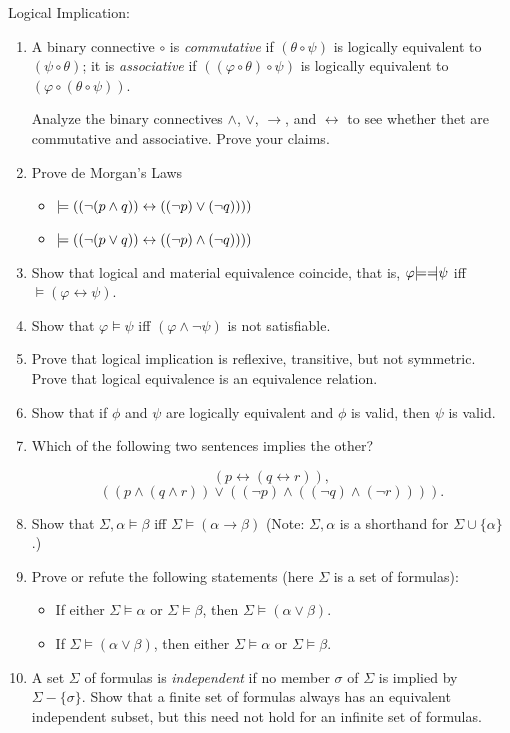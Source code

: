 \noindent
{\sf Logical Implication}:
\begin{enumerate}
\item
A binary connective $\circ$ is \emph{commutative} if
$(\theta\circ\psi)$ is logically equivalent to $(\psi\circ\theta)$;
it is \emph{associative} if
$((\varphi\circ\theta)\circ\psi)$ is logically equivalent to 
$(\varphi\circ(\theta\circ\psi))$.

Analyze the binary connectives $\wedge$, $\vee$, $\rightarrow$,
and $\leftrightarrow$ to see whether thet are commutative and
associative. Prove your claims.
\item
Prove de Morgan's Laws
\begin{itemize}
\item
$\models ((\neg(p\wedge q)) \leftrightarrow ((\neg p) \vee (\neg q))))$
\item
$\models ((\neg(p\vee q)) \leftrightarrow ((\neg p) \wedge (\neg q))))$
\end{itemize}
\item
Show that logical and material equivalence coincide, that is,
$\varphi {\models =\!\!\!|} \psi$ iff $\models (\varphi\leftrightarrow\psi)$.
\item
Show that $\varphi\models\psi$ iff $(\varphi\wedge\neg\psi)$ is not
satisfiable.
\item
Prove that logical implication is reflexive, transitive, but not symmetric.
Prove that logical equivalence is an equivalence relation.
\item
Show that if $\phi$ and $\psi$ are logically equivalent and $\phi$ is
valid, then $\psi$ is valid.
\item
Which of the following two sentences implies the other?

$$(p \leftrightarrow (q \leftrightarrow r)),$$
$$((p\wedge (q \wedge r))\vee((\neg p)\wedge ((\neg q)\wedge
(\neg r)))).$$

\item
Show that $\Sigma,\alpha \models \beta$ 
iff $\Sigma \models (\alpha \rightarrow \beta)$ 
(Note: $\Sigma,\alpha$ is a shorthand for $\Sigma\cup\{\alpha\}$.)

\item
Prove or refute the following statements (here $\Sigma$ is a set of
formulas):
\begin{itemize}
\item
If either $\Sigma \models \alpha$ or $\Sigma \models \beta$, then
$\Sigma \models (\alpha \vee \beta)$.
\item
If $\Sigma \models (\alpha \vee \beta)$, then
either $\Sigma \models \alpha$ or $\Sigma \models \beta$.
\end{itemize}

\item
A set $\Sigma$ of formulas is {\em independent\/} if no member $\sigma$
of $\Sigma$ is implied by $\Sigma - \{\sigma\}$.
Show that a finite set of formulas always has an equivalent
independent subset, but this need not hold for an infinite set of
formulas.
\end{enumerate}

